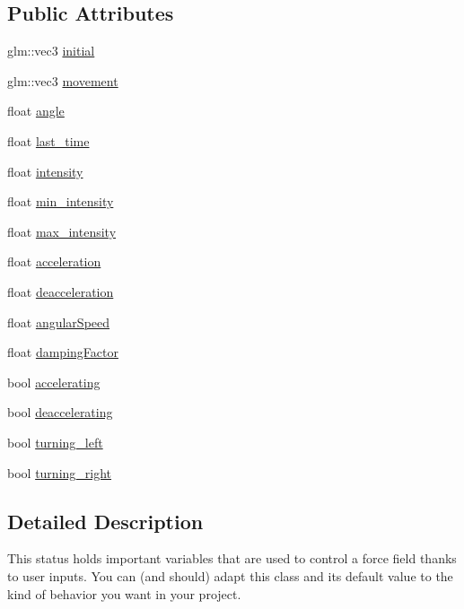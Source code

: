 \subsection*{Public Attributes}
\begin{DoxyCompactItemize}
\item 
glm\+::vec3 \hyperlink{classControlledForceFieldStatus_a63741169b32d451bd5f762c0e231ddcb}{initial}
\item 
glm\+::vec3 \hyperlink{classControlledForceFieldStatus_a961d41a96e1bd8a8bf19faddc7b07c3a}{movement}
\item 
float \hyperlink{classControlledForceFieldStatus_a1772468acae1db08a86a150ee4ab48c0}{angle}
\item 
float \hyperlink{classControlledForceFieldStatus_a68f621972d3ded5b89e30c8ecc12e7eb}{last\+\_\+time}
\item 
float \hyperlink{classControlledForceFieldStatus_a46edb7caa199a4cf2f19a129477ae920}{intensity}
\item 
float \hyperlink{classControlledForceFieldStatus_a1298575a12c041b608aaffff739e06ad}{min\+\_\+intensity}
\item 
float \hyperlink{classControlledForceFieldStatus_a444473cc468c9c055d54bf8943cae37e}{max\+\_\+intensity}
\item 
float \hyperlink{classControlledForceFieldStatus_a0e85c59573f035a73f6bd7ed30084ce9}{acceleration}
\item 
float \hyperlink{classControlledForceFieldStatus_a5c336e07e3a2e8e5acb3a887b5c7caa0}{deacceleration}
\item 
float \hyperlink{classControlledForceFieldStatus_a77d841f1237d17581c85d735955dfa01}{angular\+Speed}
\item 
float \hyperlink{classControlledForceFieldStatus_a782ddea830ffefe6ba0cdb405faa39bb}{damping\+Factor}
\item 
bool \hyperlink{classControlledForceFieldStatus_af624f63e549384cd8442991f8f9d090b}{accelerating}
\item 
bool \hyperlink{classControlledForceFieldStatus_a694b72d42f0b95525da6ccdedfc19975}{deaccelerating}
\item 
bool \hyperlink{classControlledForceFieldStatus_a264806403b30bbd69d4df3da794a43c5}{turning\+\_\+left}
\item 
bool \hyperlink{classControlledForceFieldStatus_abc4f6de46a552f7ca74c47a2c6e10c5e}{turning\+\_\+right}
\end{DoxyCompactItemize}


\subsection{Detailed Description}
This status holds important variables that are used to control a force field thanks to user inputs. You can (and should) adapt this class and its default value to the kind of behavior you want in your project. 

